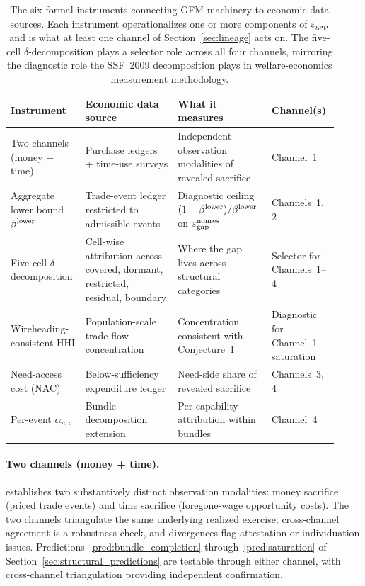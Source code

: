 \begin{table}[ht]
\centering
\footnotesize
\setlength{\tabcolsep}{4pt}
\begin{tabular}{>{\raggedright\arraybackslash}p{0.20\linewidth}
                >{\raggedright\arraybackslash}p{0.27\linewidth}
                >{\raggedright\arraybackslash}p{0.27\linewidth}
                >{\raggedright\arraybackslash}p{0.18\linewidth}}
\toprule
\textbf{Instrument} & \textbf{Economic data source} &
\textbf{What it measures} & \textbf{Channel(s)} \\
\midrule
Two channels (money + time) &
Purchase ledgers + time-use surveys &
Independent observation modalities of revealed sacrifice &
Channel~1 \\
\addlinespace
Aggregate lower bound $\beta^{\mathrm{lower}}$ &
Trade-event ledger restricted to admissible events &
Diagnostic ceiling $(1-\beta^{\mathrm{lower}})/\beta^{\mathrm{lower}}$ on $\varepsilon_{\mathrm{gap}}^{\mathrm{nonres}}$ &
Channels~1, 2 \\
\addlinespace
Five-cell $\delta$-decomposition &
Cell-wise attribution across covered, dormant, restricted, residual, boundary &
Where the gap lives across structural categories &
Selector for Channels~1--4 \\
\addlinespace
Wireheading-consistent HHI &
Population-scale trade-flow concentration &
Concentration consistent with Conjecture~1 &
Diagnostic for Channel~1 saturation \\
\addlinespace
Need-access cost (NAC) &
Below-sufficiency expenditure ledger &
Need-side share of revealed sacrifice &
Channels~3, 4 \\
\addlinespace
Per-event $\alpha_{n,c}$ &
Bundle decomposition extension &
Per-capability attribution within bundles &
Channel~4 \\
\bottomrule
\end{tabular}
\caption{The six formal instruments connecting GFM machinery to
economic data sources.  Each instrument operationalizes one or
more components of $\varepsilon_{\mathrm{gap}}$ and is what at least one channel of
Section~\ref{sec:lineage} acts on.  The five-cell
$\delta$-decomposition plays a selector role across all four
channels, mirroring the diagnostic role the SSF~2009
decomposition plays in welfare-economics measurement
methodology.}
\label{tab:instruments}
\end{table}

\paragraph{Two channels (money + time).}
\citep[Section~4]{lasser2026paper8a} establishes two
substantively distinct observation modalities: money sacrifice
(priced trade events) and time sacrifice (foregone-wage
opportunity costs).  The two channels triangulate the same
underlying realized exercise; cross-channel agreement is a
robustness check, and divergences flag attestation or
individuation issues.  Predictions~\ref{pred:bundle_completion}
through~\ref{pred:saturation} of
Section~\ref{sec:structural_predictions} are testable through
either channel, with cross-channel triangulation providing
independent confirmation.

